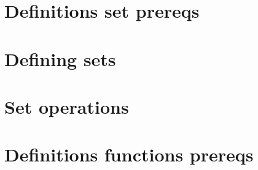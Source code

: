 
\section*{Definitions set prereqs}

\vfill
\section*{Defining sets}

\vfill
\section*{Set operations}

\vfill
\section*{Definitions functions prereqs}

\vfill
